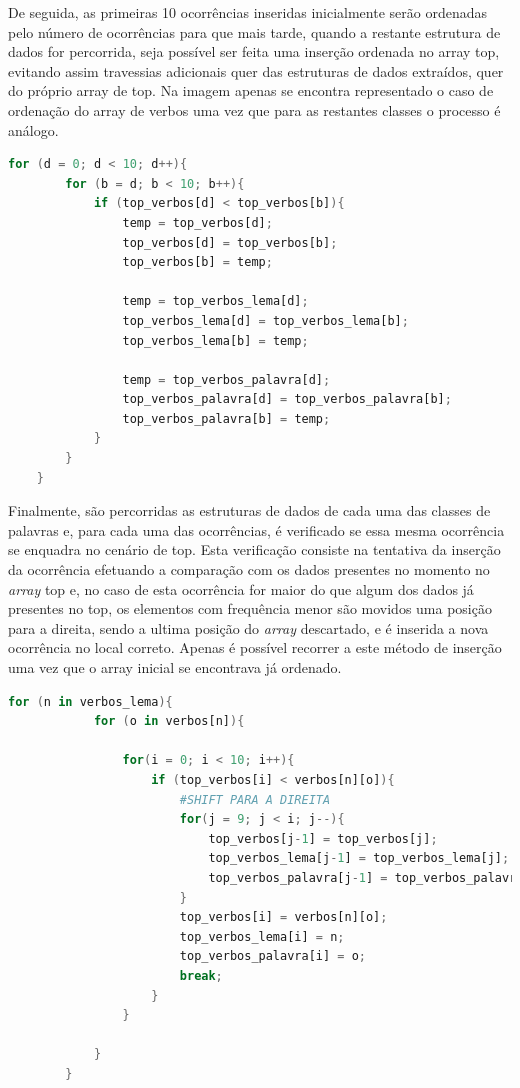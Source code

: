 \documentclass[a4paper]{article}
\begin{document}
\par De seguida, as primeiras 10 ocorrências inseridas inicialmente serão ordenadas pelo número de ocorrências para que mais tarde, quando a restante estrutura de dados for percorrida, seja possível ser feita uma inserção ordenada no array top, evitando assim travessias adicionais quer das estruturas de dados extraídos, quer do próprio array de top. Na imagem apenas se encontra representado o caso de ordenação do array de verbos uma vez que para as restantes classes o processo é análogo.

\begin{lstlisting}[language=Awk, caption=Ordenação inicial da estrutura de dados top.]
	for (d = 0; d < 10; d++){
        for (b = d; b < 10; b++){
            if (top_verbos[d] < top_verbos[b]){
                temp = top_verbos[d];
                top_verbos[d] = top_verbos[b];
                top_verbos[b] = temp;

                temp = top_verbos_lema[d];
                top_verbos_lema[d] = top_verbos_lema[b];
                top_verbos_lema[b] = temp;

                temp = top_verbos_palavra[d];
                top_verbos_palavra[d] = top_verbos_palavra[b];
                top_verbos_palavra[b] = temp;
            }
        }
    }
\end{lstlisting}

\par Finalmente, são percorridas as estruturas de dados de cada uma das classes de palavras e, para cada uma das ocorrências, é verificado se essa mesma ocorrência se enquadra no cenário de top. Esta verificação consiste na tentativa da inserção da ocorrência efetuando a comparação com os dados presentes no momento no \textit{array} top e, no caso de esta ocorrência for maior do que algum dos dados já presentes no top, os elementos com frequência menor são movidos uma posição para a direita, sendo a ultima posição do \textit{array} descartado, e é inserida a nova ocorrência no local correto. Apenas é possível recorrer a este método de inserção uma vez que o array inicial se encontrava já ordenado.

\begin{lstlisting}[language=Awk, caption=Tentativa de inserção ordenada no \textit{array} top de cada uma das ocorrências de palavra.]
	for (n in verbos_lema){
            for (o in verbos[n]){

                for(i = 0; i < 10; i++){
                    if (top_verbos[i] < verbos[n][o]){
                        #SHIFT PARA A DIREITA
                        for(j = 9; j < i; j--){
                            top_verbos[j-1] = top_verbos[j];
                            top_verbos_lema[j-1] = top_verbos_lema[j];
                            top_verbos_palavra[j-1] = top_verbos_palavra[j];
                        }
                        top_verbos[i] = verbos[n][o];
                        top_verbos_lema[i] = n;
                        top_verbos_palavra[i] = o;
                        break;
                    }
                }

            }
        }
\end{lstlisting}
\end{document}
